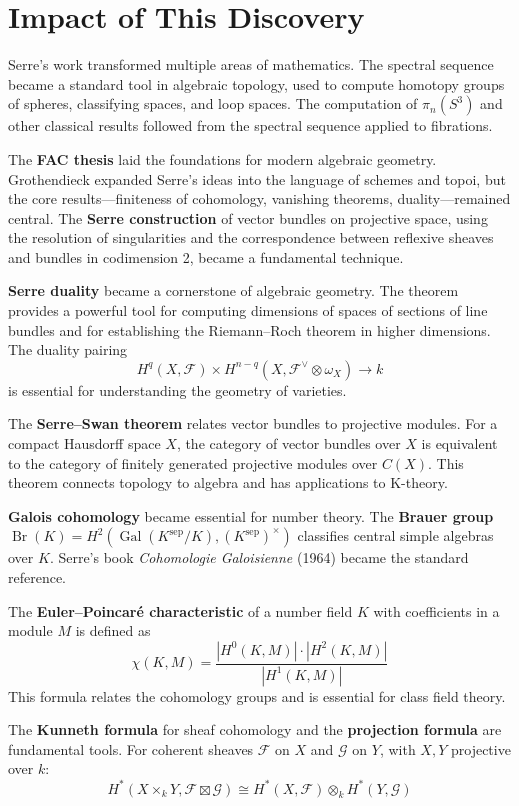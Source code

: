 \section{Impact of This Discovery}

Serre's work transformed multiple areas of mathematics. The spectral sequence became a standard tool in algebraic topology, used to compute homotopy groups of spheres, classifying spaces, and loop spaces. The computation of $\pi_n(S^3)$ and other classical results followed from the spectral sequence applied to fibrations.

The \textbf{FAC thesis} laid the foundations for modern algebraic geometry. Grothendieck expanded Serre's ideas into the language of schemes and topoi, but the core results---finiteness of cohomology, vanishing theorems, duality---remained central. The \textbf{Serre construction} of vector bundles on projective space, using the resolution of singularities and the correspondence between reflexive sheaves and bundles in codimension 2, became a fundamental technique.

\textbf{Serre duality} became a cornerstone of algebraic geometry. The theorem provides a powerful tool for computing dimensions of spaces of sections of line bundles and for establishing the Riemann--Roch theorem in higher dimensions. The duality pairing
\[H^q(X, \mathcal{F}) \times H^{n-q}(X, \mathcal{F}^\vee \otimes \omega_X) \to k\]
is essential for understanding the geometry of varieties.

The \textbf{Serre--Swan theorem} relates vector bundles to projective modules. For a compact Hausdorff space $X$, the category of vector bundles over $X$ is equivalent to the category of finitely generated projective modules over $C(X)$. This theorem connects topology to algebra and has applications to K-theory.

\textbf{Galois cohomology} became essential for number theory. The \textbf{Brauer group} $\operatorname{Br}(K) = H^2(\operatorname{Gal}(K^{\text{sep}}/K), (K^{\text{sep}})^\times)$ classifies central simple algebras over $K$. Serre's book \emph{Cohomologie Galoisienne} (1964) became the standard reference.

The \textbf{Euler--Poincaré characteristic} of a number field $K$ with coefficients in a module $M$ is defined as
\[\chi(K, M) = \frac{|H^0(K, M)| \cdot |H^2(K, M)|}{|H^1(K, M)|}\]
This formula relates the cohomology groups and is essential for class field theory.

The \textbf{Kunneth formula} for sheaf cohomology and the \textbf{projection formula} are fundamental tools. For coherent sheaves $\mathcal{F}$ on $X$ and $\mathcal{G}$ on $Y$, with $X, Y$ projective over $k$:
\[H^*(X \times_k Y, \mathcal{F} \boxtimes \mathcal{G}) \cong H^*(X, \mathcal{F}) \otimes_k H^*(Y, \mathcal{G})\]

